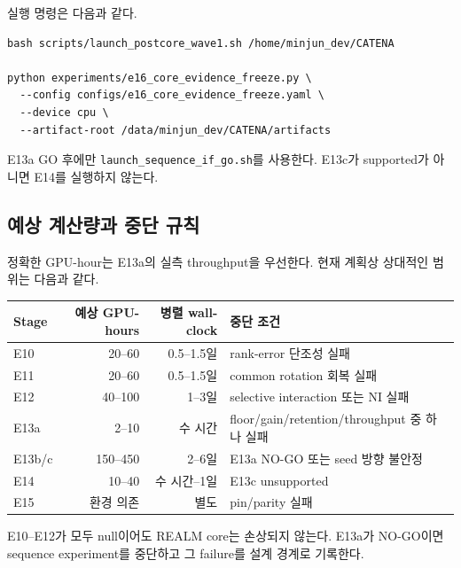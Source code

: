\documentclass[10.3pt,a4paper]{article}
\begin{document}
실행 명령은 다음과 같다.
\begin{verbatim}
bash scripts/launch_postcore_wave1.sh /home/minjun_dev/CATENA

python experiments/e16_core_evidence_freeze.py \
  --config configs/e16_core_evidence_freeze.yaml \
  --device cpu \
  --artifact-root /data/minjun_dev/CATENA/artifacts
\end{verbatim}

E13a GO 후에만 \texttt{launch\_sequence\_if\_go.sh}를 사용한다. E13c가 supported가 아니면 E14를 실행하지 않는다.

\subsection{예상 계산량과 중단 규칙}
정확한 GPU-hour는 E13a의 실측 throughput을 우선한다. 현재 계획상 상대적인 범위는 다음과 같다.

\begin{center}
\begin{tabular}{lrrl}
\toprule
Stage & 예상 GPU-hours & 병렬 wall-clock & 중단 조건 \\
\midrule
E10 & 20--60 & 0.5--1.5일 & rank-error 단조성 실패 \\
E11 & 20--60 & 0.5--1.5일 & common rotation 회복 실패 \\
E12 & 40--100 & 1--3일 & selective interaction 또는 NI 실패 \\
E13a & 2--10 & 수 시간 & floor/gain/retention/throughput 중 하나 실패 \\
E13b/c & 150--450 & 2--6일 & E13a NO-GO 또는 seed 방향 불안정 \\
E14 & 10--40 & 수 시간--1일 & E13c unsupported \\
E15 & 환경 의존 & 별도 & pin/parity 실패 \\
\bottomrule
\end{tabular}
\end{center}

E10--E12가 모두 null이어도 REALM core는 손상되지 않는다. E13a가 NO-GO이면 sequence experiment를 중단하고 그 failure를 설계 경계로 기록한다.
\end{document}
